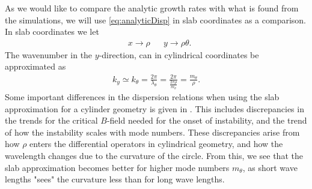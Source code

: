 As we would like to compare the analytic growth rates with what is found from the simulations, we will use \cref{eq:analyticDisp} in slab coordinates as a comparison.
In slab coordinates we let
%
\begin{align*}
    &x \to \rho&
    &y \to \rho\theta.
\end{align*}
%
The wavenumber in the $y$-direction, can in cylindrical coordinates be approximated as
%
\begin{align*}
    k_y \simeq k_\theta
    = \frac{2\pi}{\lambda_\theta}
    = \frac{2\pi}{\frac{2\pi \rho}{m_\theta}}
    = \frac{m_\theta}{\rho}.
\end{align*}
%
Some important differences in the dispersion relations when using the slab approximation for a cylinder geometry is given in \cite{Ellis1980}.
This includes discrepancies in the trends for the critical $B$-field needed for the onset of instability, and the trend of how the instability scales with mode numbers.
These discrepancies arise from how $\rho$ enters the differential operators in cylindrical geometry, and how the wavelength changes due to the curvature of the circle.
From this, we see that the slab approximation becomes better for higher mode numbers $m_\theta$, as short wave lengths "sees" the curvature less than for long wave lengths.

